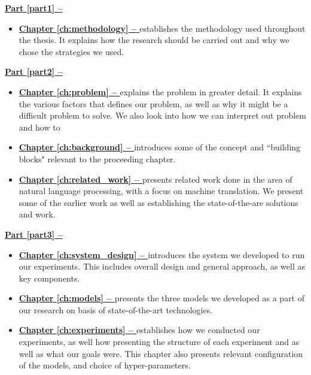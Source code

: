 \vspace{0.5cm}\noindent
\begin{minipage}{\linewidth}
    \textbf{{\hyperref[part1]{Part \ref{part1} -- }}}
    \begin{itemize}
        \item\textbf{\hyperref[ch:methodology]{Chapter \ref{ch:methodology} -- }} establishes the methodology used throughout the thesis. It explains how the research should be carried out and why we chose the strategies we used.
    \end{itemize}
\end{minipage}

\vspace{0.5cm}\noindent
\begin{minipage}{\linewidth}
    \textbf{{\hyperref[part2]{Part \ref{part2} -- }}}
    \begin{itemize}
        \item\textbf{\hyperref[ch:problem]{Chapter \ref{ch:problem} -- }} explains the problem in greater detail. It explains the various factors that defines our problem, as well as why it might be a difficult problem to solve. We also look into how we can interpret out problem and how to 
        \item\textbf{\hyperref[ch:background]{Chapter \ref{ch:background} -- }} introduces some of the concept and ``building blocks" relevant to the proceeding chapter.
        \item\textbf{\hyperref[ch:related_work]{Chapter \ref{ch:related_work} -- }} presents related work done in the area of natural language processing, with a focus on machine translation. We present some of the earlier work as well as establishing the state-of-the-are solutions and work.
    \end{itemize}
\end{minipage}

\vspace{0.5cm}\noindent
\begin{minipage}{\linewidth}
    \textbf{{\hyperref[part3]{Part \ref{part3} -- }}}
    \begin{itemize}
        \item\textbf{\hyperref[ch:system_design]{Chapter \ref{ch:system_design} -- }} introduces the system we developed to run our experiments. This includes overall design and general approach, as well as key components.
        \item\textbf{\hyperref[ch:models]{Chapter \ref{ch:models} -- }} presents the three models we developed as a part of our research on basis of state-of-the-art technologies.
        \item\textbf{\hyperref[ch:experiments]{Chapter \ref{ch:experiments} -- }} establishes how we conducted our experiments, as well how presenting the structure of each experiment and as well as what our goals were. This chapter also presents relevant configuration of the models, and choice of hyper-parameters.
    \end{itemize}
\end{minipage}

